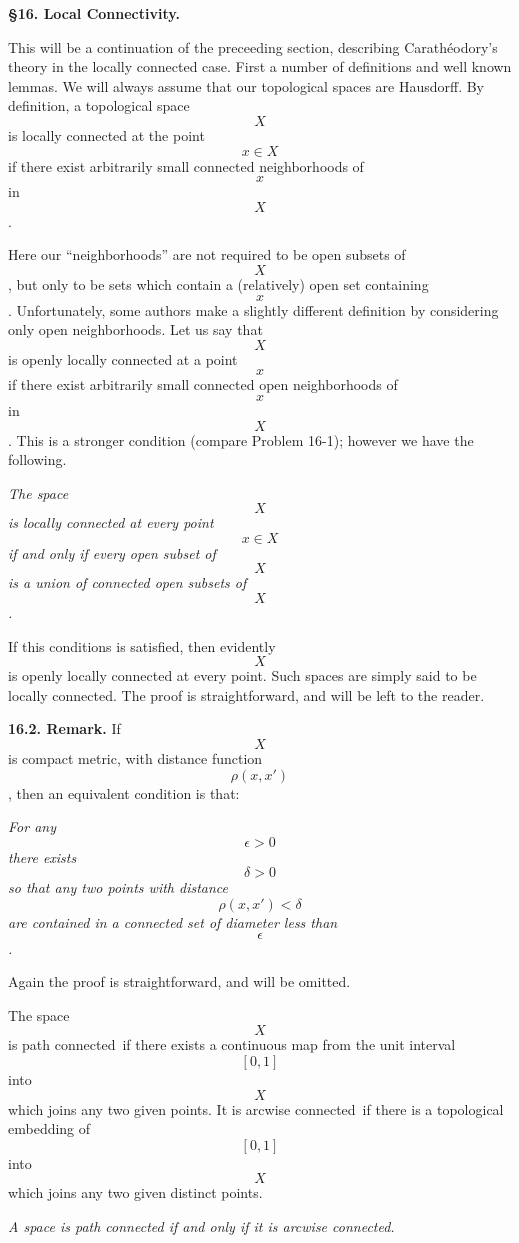\centerline{\bf \S16. Local Connectivity.}\bigskip

This will be a continuation of the preceeding section, describing
Carath\'eodory's theory in the locally connected case. First a number
of definitions and well known lemmas.
We will always assume that our topological spaces are Hausdorff.
By definition, a topological space \[X\] is {\bit locally connected} at
the point \[x\in X\] if there exist arbitrarily small connected neighborhoods
of \[x\] in \[X\].

Here our ``neighborhoods'' are not required to be open subsets
of \[X\], but only to be sets which contain a (relatively) open set
containing \[x\]. Unfortunately, some authors make a slightly different
definition by considering only open neighborhoods. Let us say
that \[X\] is {\bit openly locally connected} at a point \[x\] if there exist
arbitrarily small connected open neighborhoods of \[x\] in \[X\]. This
is a stronger condition (compare Problem 16-1); however we have the following.

{ \it The space \[X\] is locally connected at every point
\[x\in X\] if and only if every open subset of \[X\] is a union of
connected open subsets of \[X\].\medskip}

\noindent If this conditions is satisfied, then evidently
\[X\] is openly locally connected at every point.
Such spaces are simply said to be {\bit locally connected}.
The proof is straightforward, and will be left to the reader.\QED

{\bf 16.2. Remark.} If \[X\] is compact metric, with distance
function \[\rho(x,x')\], then an equivalent condition is that:

{\narrower\smallskip\noindent\it
For any \[\epsilon>0\] there exists \[\delta>0\] so that any two points
with distance\break \[\rho(x,x')<\delta\] are contained in a connected set of
diameter less than \[\epsilon\].\smallskip}

\noindent Again the proof is straightforward, and will be omitted.\smallskip

The space \[X\] is {\bit path connected}$\, $ if there exists a continuous
map from the unit interval \[[0,1]\] into \[X\] which joins any two given
points. It is {\bit arcwise connected}$\,$ if there is a topological embedding
of \[[0,1]\] into \[X\] which joins any two given distinct points.

{ {\it A space is path connected if and only if it
is arcwise connected.}\medskip}

